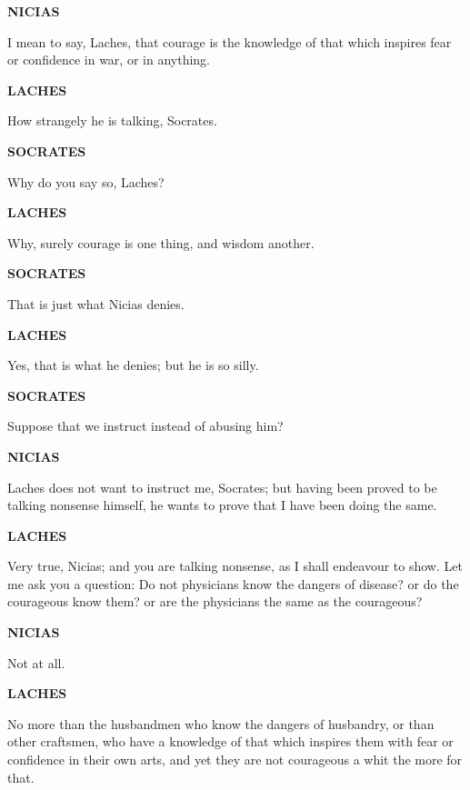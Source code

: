 \documentclass[11pt,letter]{book}
\begin{document}
\par \textbf{NICIAS}
\par   I mean to say, Laches, that courage is the knowledge of that which inspires fear or confidence in war, or in anything.

\par \textbf{LACHES}
\par   How strangely he is talking, Socrates.

\par \textbf{SOCRATES}
\par   Why do you say so, Laches?

\par \textbf{LACHES}
\par   Why, surely courage is one thing, and wisdom another.

\par \textbf{SOCRATES}
\par   That is just what Nicias denies.

\par \textbf{LACHES}
\par   Yes, that is what he denies; but he is so silly.

\par \textbf{SOCRATES}
\par   Suppose that we instruct instead of abusing him?

\par \textbf{NICIAS}
\par   Laches does not want to instruct me, Socrates; but having been proved to be talking nonsense himself, he wants to prove that I have been doing the same.

\par \textbf{LACHES}
\par   Very true, Nicias; and you are talking nonsense, as I shall endeavour to show. Let me ask you a question:  Do not physicians know the dangers of disease? or do the courageous know them? or are the physicians the same as the courageous?

\par \textbf{NICIAS}
\par   Not at all.

\par \textbf{LACHES}
\par   No more than the husbandmen who know the dangers of husbandry, or than other craftsmen, who have a knowledge of that which inspires them with fear or confidence in their own arts, and yet they are not courageous a whit the more for that.
\end{document}
